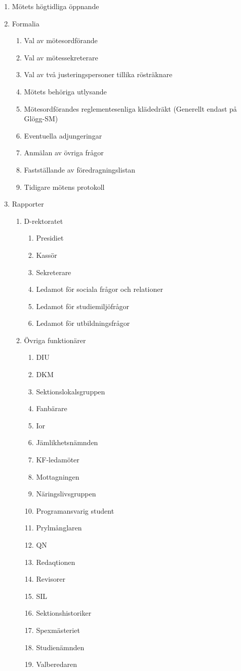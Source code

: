 \documentclass[a4paper,12pt]{article}
\begin{document}
\begin{enumerate}
  \item Mötets högtidliga öppnande
  \item Formalia\begin{enumerate}
  \item Val av mötesordförande
  \item Val av mötessekreterare
  \item Val av två justeringspersoner tillika rösträknare
  \item Mötets behöriga utlysande
  \item Mötesordförandes reglementesenliga klädedräkt (Generellt endast på Glögg-SM)
  \item Eventuella adjungeringar
  \item Anmälan av övriga frågor
  \item Fastställande av föredragningslistan
  \item Tidigare mötens protokoll
\end{enumerate}


  \item Rapporter\begin{enumerate}
  \item D-rektoratet\begin{enumerate}
  \item Presidiet
  \item Kassör
  \item Sekreterare
  \item Ledamot för sociala frågor och relationer
  \item Ledamot för studiemiljöfrågor
  \item Ledamot för utbildningsfrågor
\end{enumerate}


  \item Övriga funktionärer\begin{enumerate}
  \item DIU
  \item DKM
  \item Sektionslokalsgruppen
  \item Fanbärare
  \item Ior
  \item Jämlikhetsnämnden
  \item KF-ledamöter
  \item Mottagningen
  \item Näringslivsgruppen
  \item Programansvarig student
  \item Prylmånglaren
  \item QN
  \item Redaqtionen
  \item Revisorer
  \item SIL
  \item Sektionshistoriker
  \item Spexmästeriet
  \item Studienämnden
  \item Valberedaren
\end{enumerate}



\end{enumerate}
\end{enumerate}
\end{document}
